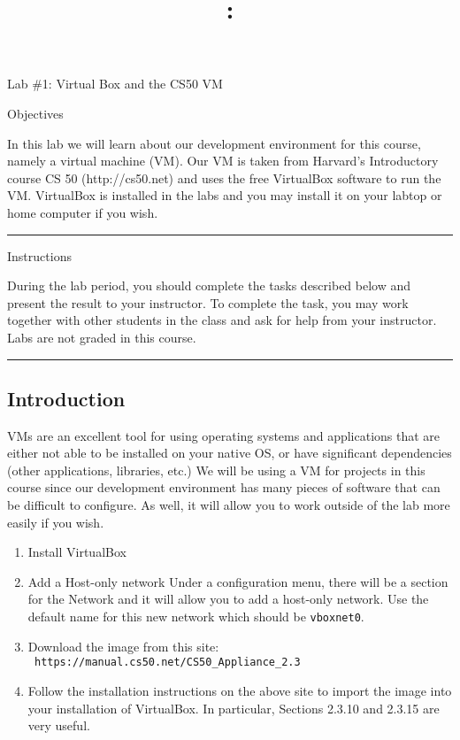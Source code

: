 \documentclass[letterpaper]{article}
\title{\course{}: \activity{}}
\date{}
\newcommand{\activity}{Lab \#1}
\newcommand{\horizrule}{\noindent\rule{\linewidth}{0.15mm}}
\begin{document}
\reversemarginpar

\begin{center}
  \Large{\activity{}: Virtual Box and the CS50 VM}
\end{center}

\begin{center}
  \large{Objectives}
\end{center}

In this lab we will learn about our development environment for this course,
namely a virtual machine (VM).  Our VM is taken from Harvard's Introductory
course CS 50 (http://cs50.net) and uses the free VirtualBox software to run the
VM.  VirtualBox is installed in the labs and you may install it on your labtop
or home computer if you wish.
\vspace{3mm}\\
\horizrule

\begin{center}
  \large{Instructions}
\end{center}

During the lab period, you should complete the tasks described below and
present the result to your instructor.  To complete the task, you may work
together with other students in the class and ask for help from your
instructor.  Labs are not graded in this course.
\vspace{3mm}\\
\horizrule

\subsection*{Introduction}

VMs are an excellent tool for using operating systems and applications that are
either not able to be installed on your native OS, or have significant
dependencies (other applications, libraries, etc.)  We will be using a VM for
projects in this course since our development environment has many pieces of
software that can be difficult to configure.  As well, it will allow you to
work outside of the lab more easily if you wish.

\begin{enumerate}
\item Install VirtualBox
\item Add a Host-only network
  Under a configuration menu, there will be a section for the Network and it
will allow you to add a host-only network.  Use the default name for this new
network which should be {\tt vboxnet0}.
\item Download the image from this site: \\
  \verb+ https://manual.cs50.net/CS50_Appliance_2.3 +
\item Follow the installation instructions on the above site to import the
image into your installation of VirtualBox.  In particular,
Sections 2.3.10 and 2.3.15 are very useful.
\end{enumerate}
\end{document}
